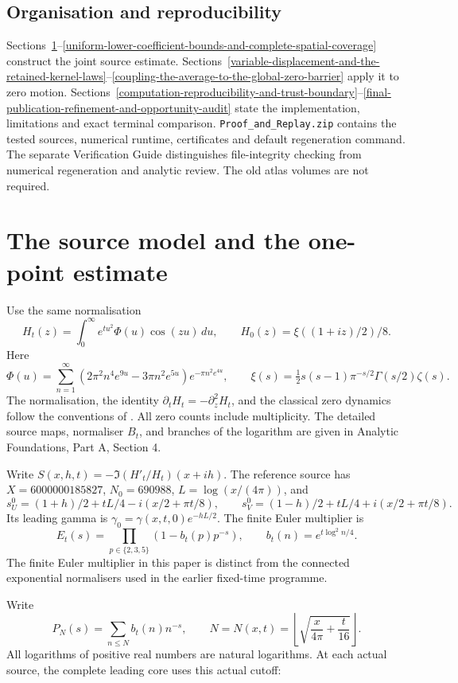 \documentclass[11pt,a4paper]{article}
\begin{document}
\subsection{Organisation and reproducibility}
Sections~\ref{the-source-model-and-its-existing-inequalities}--\ref{uniform-lower-coefficient-bounds-and-complete-spatial-coverage}
construct the joint source estimate. Sections~\ref{variable-displacement-and-the-retained-kernel-laws}--\ref{coupling-the-average-to-the-global-zero-barrier}
apply it to zero motion. Sections~\ref{computation-reproducibility-and-trust-boundary}--\ref{final-publication-refinement-and-opportunity-audit}
state the implementation, limitations and exact terminal comparison.
\texttt{Proof\_and\_Replay.zip} contains the tested sources, numerical runtime,
certificates and default regeneration command. The separate Verification
Guide distinguishes file-integrity checking from numerical regeneration
and analytic review. The old atlas volumes are not required.

\section{The source model and the one-point estimate}\label{the-source-model-and-its-existing-inequalities}

Use the same normalisation
\[
H_t(z)=\int_0^\infty e^{tu^2}\Phi(u)\cos(zu)\,du,
\qquad H_0(z)=\xi((1+iz)/2)/8.
\]
Here
\[
\Phi(u)=\sum_{n=1}^{\infty}
(2\pi^2n^4e^{9u}-3\pi n^2e^{5u})e^{-\pi n^2e^{4u}},
\qquad
\xi(s)=\tfrac12s(s-1)\pi^{-s/2}\Gamma(s/2)\zeta(s).
\]
The normalisation, the identity $\partial_tH_t=-\partial_z^2H_t$,
and the classical zero dynamics follow the conventions of
\cite{polymath}. All zero counts include multiplicity. The detailed
source maps, normaliser $B_t$, and branches of the logarithm are given in
Analytic Foundations, Part A, Section 4.

Write \(S(x,h,t)=-\Im(H'_t/H_t)(x+ih)\). The reference source has
\(X=6000000185827\), \(N_0=690988\), \(L=\log(x/(4\pi))\), and
\[
 s_U^0=(1+h)/2+tL/4-i(x/2+\pi t/8),\qquad
 s_V^0=(1-h)/2+tL/4+i(x/2+\pi t/8).
\]
Its leading gamma is \(\gamma_0=\gamma(x,t,0)e^{-hL/2}\).
The finite Euler multiplier is
\[
 E_t(s)=\prod_{p\in\{2,3,5\}}(1-b_t(p)p^{-s}),
 \qquad b_t(n)=e^{t\log^2n/4}.
\]
The finite Euler multiplier in this paper is distinct from the connected
exponential normalisers used in the earlier fixed-time programme.

Write
\[
P_N(s)=\sum_{n\le N}b_t(n)n^{-s},
\qquad
N=N(x,t)=\left\lfloor\sqrt{\frac{x}{4\pi}+\frac{t}{16}}\right\rfloor.
\]
All logarithms of positive real numbers are natural logarithms. At each
actual source, the complete leading core uses this actual cutoff:
\end{document}
